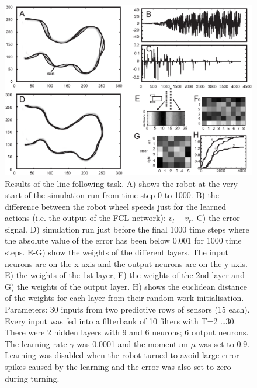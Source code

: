 \documentclass[Afour,sageh,times]{sagej}
\begin{document}
\begin{figure}[!ht]
  \centering
  \includegraphics[width=\linewidth]{line_results}
  \caption{Results of the line following task. A) shows the robot at
    the very start of the simulation run from time step 0 to 1000. B)
    the difference between the robot wheel speeds just for the learned
    actions (i.e. the output of the FCL network): $v_l-v_r$.  C) the
    error signal.  D) simulation run just before the final 1000 time
    steps where the absolute value of the error has been below 0.001
    for 1000 time steps. E-G) show the weights of the different
    layers. The input neurons are on the x-axis and the output neurons
    are on the y-axis.  E) the weights of the 1st layer, F) the
    weights of the 2nd layer and G) the weights of the output layer.
    H) shows the euclidean distance of the weights for each layer from
    their random work initialisation. Parameters: 30 inputs from two
    predictive rows of sensors (15 each). Every input was fed into a
    filterbank of 10 filters with T=2 \ldots 30. There were 2 hidden
    layers with 9 and 6 neurons; 6 output neurons. The learning rate $\gamma$
    was 0.0001 and the momentum $\mu$ was set to 0.9. Learning was disabled
    when the robot turned to avoid large error spikes caused by the learning
    and the error was also set to zero during turning.
    \label{line_results}}
\end{figure}
\end{document}
